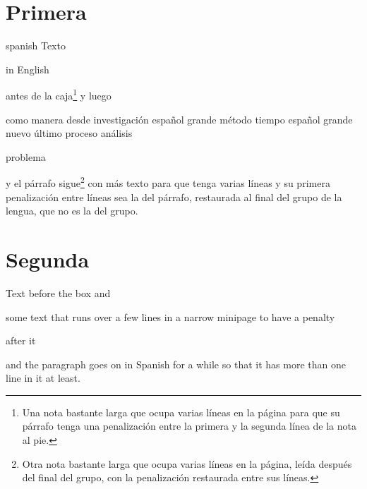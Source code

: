 \documentclass[english,spanish]{article}
\begin{document}
\section{Primera}
\begin{otherlanguage*}{spanish}
Texto \begin{otherlanguage}{english}in English\end{otherlanguage} antes de la caja\footnote{Una nota bastante larga que ocupa varias líneas en la página para que su párrafo
tenga una penalización entre la primera y la segunda línea de la nota al pie.} y luego
\begin{minipage}{.3\linewidth}
como manera desde investigación español grande método tiempo español grande nuevo último proceso análisis
\end{minipage} problema
\end{otherlanguage*}
y el párrafo sigue\footnote{Otra nota bastante larga que ocupa varias líneas en la página, leída después del final
del grupo, con la penalización restaurada entre sus líneas.} con más texto para que tenga varias líneas y su primera penalización entre líneas sea la del
párrafo, restaurada al final del grupo de la lengua, que no es la del grupo.

\section{Segunda}
\begin{otherlanguage}{english}
Text before the box and
\begin{minipage}{.3\linewidth}
some text that runs over a few lines in a narrow minipage to have a penalty
\end{minipage} after it
\end{otherlanguage}
and the paragraph goes on in Spanish for a while so that it has more than one line in it at least.
\end{document}

